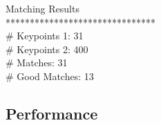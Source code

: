 Matching Results\\
*******************************\\
\# Keypoints 1:                           31\\
\# Keypoints 2:                           400\\
\# Matches:                               31\\
\# Good Matches:                          13\\

\subsection{Performance}



